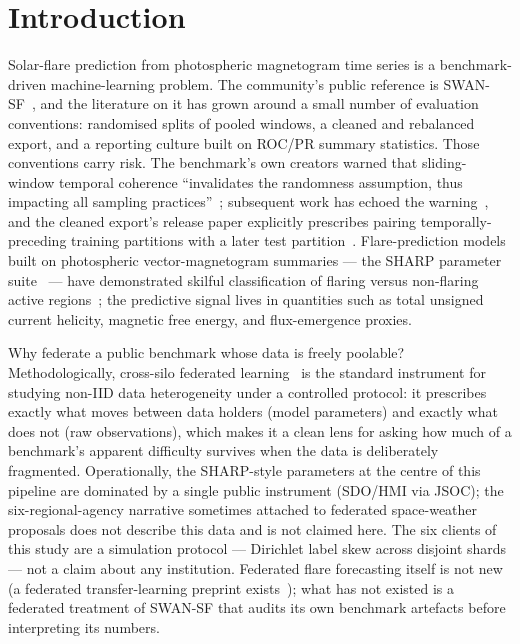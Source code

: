 \section{Introduction}\label{sec:intro}

Solar-flare prediction from photospheric magnetogram time series is a
benchmark-driven machine-learning problem. The community's public
reference is SWAN-SF~\cite{angryk2020}, and the literature on it has
grown around a small number of evaluation conventions: randomised
splits of pooled windows, a cleaned and rebalanced export, and a
reporting culture built on ROC/PR summary statistics. Those
conventions carry risk. The benchmark's own creators warned that
sliding-window temporal coherence ``invalidates the randomness
assumption, thus impacting all sampling
practices''~\cite{angryk2019}; subsequent work has echoed the
warning~\cite{ahmadzadeh2021}, and the cleaned export's release paper
explicitly prescribes pairing temporally-preceding training
partitions with a later test partition~\cite{eskandari2024}.
Flare-prediction models built on photospheric vector-magnetogram
summaries --- the SHARP parameter suite~\cite{bobra2015} --- have
demonstrated skilful classification of flaring versus non-flaring
active regions~\cite{leka2019,georgoulis2021}; the predictive signal
lives in quantities such as total unsigned current helicity,
magnetic free energy, and flux-emergence proxies.

Why federate a public benchmark whose data is freely poolable?
Methodologically, cross-silo federated
learning~\cite{mcmahan2017,kairouz2021} is the standard instrument
for studying non-IID data heterogeneity under a controlled protocol:
it prescribes exactly what moves between data holders (model
parameters) and exactly what does not (raw observations), which makes
it a clean lens for asking how much of a benchmark's apparent
difficulty survives when the data is deliberately fragmented.
Operationally, the SHARP-style parameters at the centre of this
pipeline are dominated by a single public instrument (SDO/HMI via
JSOC); the six-regional-agency narrative sometimes attached to
federated space-weather proposals does not describe this data and is
not claimed here. The six clients of this study are a simulation
protocol --- Dirichlet label skew across disjoint shards --- not a
claim about any institution. Federated flare forecasting itself is
not new (a federated transfer-learning preprint exists~\cite{fu2023});
what has not existed is a federated treatment of SWAN-SF that audits
its own benchmark artefacts before interpreting its numbers.

